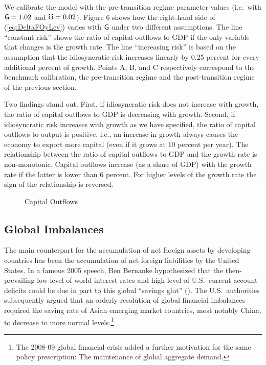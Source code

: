 \documentclass[titlepage,abstract,letterpaper]{econtex}
\begin{document}
We calibrate the model with the pre-transition regime parameter values
(i.e.\ with $\mathsf{G}=1.02$ and $\mho=0.02$). Figure 6 shows how the
right-hand side of (\ref{eq:DeltaFOyLev}) varies with $\mathsf{G}$ under
two different assumptions. The line ``constant risk'' shows the ratio
of capital outflows to GDP if the only variable that changes is the
growth rate. The line ``increasing risk'' is based on the assumption
that the idiosyncratic risk increases linearly by 0.25 percent for
every additional percent of growth. Points A, B, and C respectively
correspond to the benchmark calibration, the pre-transition regime and
the post-transition regime of the previous section.

Two findings stand out. First, if idiosyncratic risk does not increase
with growth, the ratio of capital outflows to GDP is decreasing with
growth. Second, if idiosyncratic risk increases with growth as we have
specified, the ratio of capital outflows to output is positive, i.e.,
an increase in growth always causes the economy to export more capital
(even if it grows at 10 percent per year). The relationship between
the ratio of capital outflows to GDP and the growth rate is
non-monotonic. Capital outflows increase (as a share of GDP) with the
growth rate if the latter is lower than 6 percent. For higher levels
of the growth rate the sign of the relationship is reversed.

\medskip

\begin{figure}
\caption{Capital Outflows}\label{fig:capOutflows}
\end{figure}

\medskip


\subsection{Global Imbalances}

The main counterpart for the accumulation of net foreign assets by
developing countries has been the accumulation of net foreign
liabilities by the United States. In a famous 2005 speech, Ben
Bernanke hypothesized that the then-prevailing low level of world
interest rates and high level of U.S.\ current account deficits could
be due in part to this global ``savings glut''
(\cite{Bernanke:savingglut}). The U.S.\ authorities subsequently
argued that an orderly resolution of global financial imbalances
required the saving rate of Asian emerging market countries, most
notably China, to decrease to more normal levels.\footnote{The
    2008-09 global financial crisis added a further motivation for the
    same policy prescription: The maintenance of global aggregate
    demand.}
\end{document}
